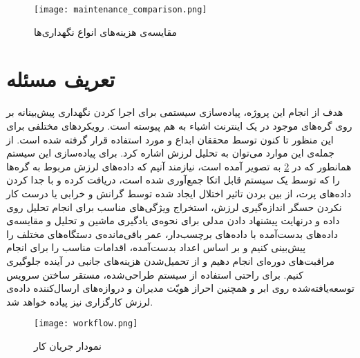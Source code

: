 \begin{figure}[!h]
\centerline{\texttt{[image: maintenance\_comparison.png]}}
\caption{مقایسه‌ی هزینه‌های انواع نگهد‌اری‌ها}
\label{fig:maintenance_comparison}
\end{figure}


\section{تعریف مسئله}
هدف از انجام این پروژه، پیاده‌سازی سیستمی برای اجرا کردن نگهداری پیش‌بینانه بر روی گره‌های موجود در یک اینترنت اشیاء به هم پیوسته است. رویکردهای مختلفی برای این منظور تا کنون توسط محققان ابداع و مورد استفاده قرار گرفته شده است. از جمله‌ی این موارد می‌توان به تحلیل لرزش اشاره کرد. برای پیاده‌سازی این سیستم همانطور که در \cref{fig:workflow} به تصویر آمده ‌است، نیازمند آنیم که داده‌های لرزش مربوط به گره‌ها را که توسط یک سیستم قابل اتکا جمع‌آوری شده است، دریافت کرده و با جدا کردن داده‌های پرت، از بین بردن تاثیر اختلال ایجاد شده توسط گرانش و خرابی یا درست‌ کار نکردن حسگر اندازه‌گیری لرزش، استخراج ویژگی‌های مناسب برای انجام تحلیل روی داده و درنهایت پیشنهاد دادن مدلی برای نحوه‌ی یادگیری ماشین و تحلیل و مقایسه‌ی داده‌های بدست‌آمده با داده‌های برچسب‌دار، عمر باقی‌مانده‌ی دستگاه‌های مختلف را پیش‌بینی کنیم و بر اساس اعداد بدست‌آمده، اقدامات مناسب را برای انجام مراقبت‌های دوره‌ای انجام دهیم و از تحمیل‌شدن هزینه‌های جانبی در آینده جلوگیری کنیم\cite{jung2017vibration}. برای راحتی استفاده از سیستم طراحی‌شده، مستقر ساختن سرویس توسعه‌یافته‌شده روی ابر و همچنین احراز هویّت مدیران و دروازه‌های ارسال‌کننده داده‌ی لرزش کارگزاری نیز پیاده خواهد شد.

\begin{figure}[!h]
\centerline{\texttt{[image: workflow.png]}}
\caption{نمودار جریان کار}
\label{fig:workflow}
\end{figure}



